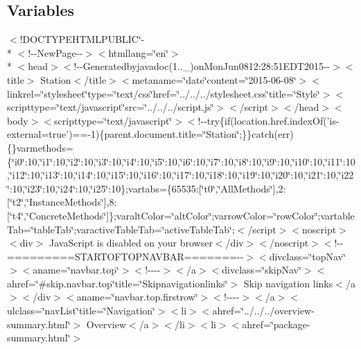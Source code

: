 \subsection*{Variables}
\begin{DoxyCompactItemize}
\item 
$<$!D\-O\-C\-T\-Y\-P\-E\-H\-T\-M\-L\-P\-U\-B\-L\-I\-C\char`\"{}-\/\\*
$<$!-\/-\/New\-Page-\/-\/$>$$<$htmllang=\char`\"{}en\char`\"{}$>$\\*
$<$head$>$$<$!-\/-\/Generatedbyjavadoc(1..\-\_)on\-Mon\-Jun0812\-:28\-:51\-E\-D\-T2015-\/-\/$>$$<$title$>$ Station$<$/title$>$$<$metaname=\char`\"{}date\char`\"{}content=\char`\"{}2015-\/06-\/08\char`\"{}$>$$<$linkrel=\char`\"{}stylesheet\char`\"{}type=\char`\"{}text/css\char`\"{}href=\char`\"{}../../../stylesheet.\-css\char`\"{}title=\char`\"{}\-Style\char`\"{}$>$$<$scripttype=\char`\"{}text/javascript\char`\"{}src=\char`\"{}../../../script.\-js\char`\"{}$>$$<$/script$>$$<$/head$>$$<$body$>$$<$scripttype=\char`\"{}text/javascript\char`\"{}$>$$<$!-\/-\/try\{if(location.\-href.\-index\-Of('is-\/external=true')==-\/1)\{parent.\-document.\-title=\char`\"{}\-Station\char`\"{};\}\}catch(err)\{\}varmethods=\{\char`\"{}i0\char`\"{}\-:10,\char`\"{}i1\char`\"{}\-:10,\char`\"{}i2\char`\"{}\-:10,\char`\"{}i3\char`\"{}\-:10,\char`\"{}i4\char`\"{}\-:10,\char`\"{}i5\char`\"{}\-:10,\char`\"{}i6\char`\"{}\-:10,\char`\"{}i7\char`\"{}\-:10,\char`\"{}i8\char`\"{}\-:10,\char`\"{}i9\char`\"{}\-:10,\char`\"{}i10\char`\"{}\-:10,\char`\"{}i11\char`\"{}\-:10,\char`\"{}i12\char`\"{}\-:10,\char`\"{}i13\char`\"{}\-:10,\char`\"{}i14\char`\"{}\-:10,\char`\"{}i15\char`\"{}\-:10,\char`\"{}i16\char`\"{}\-:10,\char`\"{}i17\char`\"{}\-:10,\char`\"{}i18\char`\"{}\-:10,\char`\"{}i19\char`\"{}\-:10,\char`\"{}i20\char`\"{}\-:10,\char`\"{}i21\char`\"{}\-:10,\char`\"{}i22\char`\"{}\-:10,\char`\"{}i23\char`\"{}\-:10,\char`\"{}i24\char`\"{}\-:10,\char`\"{}i25\char`\"{}\-:10\};vartabs=\{65535\-:\mbox{[}\char`\"{}t0\char`\"{},\char`\"{}\-All\-Methods\char`\"{}\mbox{]},2\-:\mbox{[}\char`\"{}t2\char`\"{},\char`\"{}\-Instance\-Methods\char`\"{}\mbox{]},8\-:\mbox{[}\char`\"{}t4\char`\"{},\char`\"{}\-Concrete\-Methods\char`\"{}\mbox{]}\};varalt\-Color=\char`\"{}alt\-Color\char`\"{};varrow\-Color=\char`\"{}row\-Color\char`\"{};vartable\-Tab=\char`\"{}table\-Tab\char`\"{};varactive\-Table\-Tab=\char`\"{}active\-Table\-Tab\char`\"{};$<$/script$>$$<$noscript$>$$<$div$>$ Java\-Script is disabled on your browser$<$/div$>$$<$/noscript$>$$<$!-\/-\/=========\-S\-T\-A\-R\-T\-O\-F\-T\-O\-P\-N\-A\-V\-B\-A\-R=======-\/-\/$>$$<$divclass=\char`\"{}top\-Nav\char`\"{}$>$$<$aname=\char`\"{}navbar.\-top\char`\"{}$>$$<$!-\/-\/-\/-\/$>$$<$/a$>$$<$divclass=\char`\"{}skip\-Nav\char`\"{}$>$$<$ahref=\char`\"{}\#skip.\-navbar.\-top\char`\"{}title=\char`\"{}\-Skipnavigationlinks\char`\"{}$>$ Skip navigation links$<$/a$>$$<$/div$>$$<$aname=\char`\"{}navbar.\-top.\-firstrow\char`\"{}$>$$<$!-\/-\/-\/-\/$>$$<$/a$>$$<$ulclass=\char`\"{}nav\-List\char`\"{}title=\char`\"{}\-Navigation\char`\"{}$>$$<$li$>$$<$ahref=\char`\"{}../../../overview-\/summary.\-html\char`\"{}$>$ Overview$<$/a$>$$<$/li$>$$<$li$>$$<$ahref=\char`\"{}package-\/summary.\-html\char`\"{}$>$ $$
\end{DoxyCompactItemize}

